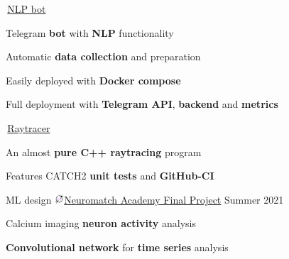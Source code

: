 
\begin{cventries}
  \cventry
    {} %
    {\,\faGithub\acvHeaderIconSep\href{https://github.com/BlackSamorez/ebanko}{NLP bot}} %
    {} %
    {} %
    {
      \begin{cvitems} %
        \item {Telegram \textbf{bot} with \textbf{NLP} functionality}
        \item {Automatic \textbf{data collection} and preparation}
        \item {Easily deployed with \textbf{Docker compose}}
		\item {Full deployment with \textbf{Telegram API}, \textbf{backend} and \textbf{metrics}}
      \end{cvitems}
    }
    
  \cventry
    {} %
    {\,\faGithub\acvHeaderIconSep\href{https://github.com/BlackSamorez/raytracer21}{Raytracer}} %
    {} %
    {} %
    {
      \begin{cvitems} %
        \item {An almost \textbf{pure C++ raytracing} program}
		\item {Features CATCH2 \textbf{unit tests} and \textbf{GitHub-CI}}
      \end{cvitems}
    }
    
  \cventry
    {ML design}
    {\includegraphics[width=3.5mm]{snippy-nma.png}\href{https://portal.neuromatchacademy.org/certificate/a6398835-adc9-4528-99d6-347675c05ffd}{Neuromatch Academy Final Project}}
    {}
    {Summer 2021}
    {
      \begin{cvitems}
        \item {Calcium imaging \textbf{neuron activity} analysis}
        \item {\textbf{Convolutional network} for \textbf{time series} analysis}
      \end{cvitems}
    }

\end{cventries}